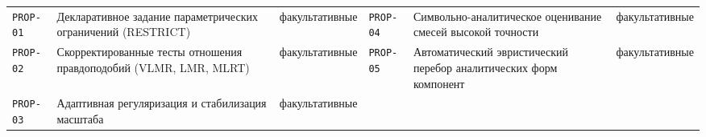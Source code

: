 \documentclass[10pt,a4paper]{article}
\begin{document}
\begin{landscape}
{\begin{longtable}{@{}l *{5}{c}@{}}
\bottomrule
\end{longtable}}
{\scriptsize\setlength{\tabcolsep}{3pt}
\begin{tabular}{@{}l >{\raggedright\arraybackslash}p{7.4cm} l l >{\raggedright\arraybackslash}p{7.4cm} l@{}}
\texttt{PROP-01} & Декларативное задание параметрических ограничений (RESTRICT) & факультативные & \texttt{PROP-04} & Символьно-аналитическое оценивание смесей высокой точности & факультативные \\
\texttt{PROP-02} & Скорректированные тесты отношения правдоподобий (VLMR, LMR, MLRT) & факультативные & \texttt{PROP-05} & Автоматический эвристический перебор аналитических форм компонент & факультативные \\
\texttt{PROP-03} & Адаптивная регуляризация и стабилизация масштаба & факультативные &  & &  \\
\end{tabular}}


\end{landscape}
\end{document}
